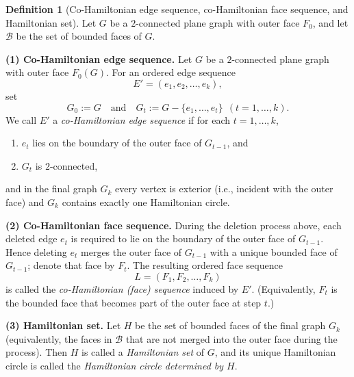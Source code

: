 \documentclass[12pt]{amsart}
\theoremstyle{theorem}%
\theoremstyle{definition}%
\newtheorem{definition}{Definition}
\begin{document}
\begin{definition}[Co-Hamiltonian edge sequence, co-Hamiltonian face sequence, and Hamiltonian set]\label{coh}
Let $G$ be a $2$-connected plane graph with outer face $F_0$, and let $\mathcal{B}$ be the set of bounded faces of $G$.

\smallskip
\noindent\textbf{(1) Co-Hamiltonian edge sequence.}
Let $G$ be a $2$-connected plane graph with outer face $F_0(G)$.
For an ordered edge sequence
\[
E'=(e_1,e_2,\dots,e_k),
\]
set
\[
G_0:=G
\quad\text{and}\quad
G_t:=G-\{e_1,\dots,e_t\}\ \ (t=1,\dots,k).
\]
We call $E'$ a \emph{co-Hamiltonian edge sequence} if for each $t=1,\dots,k$,
\begin{enumerate}
\item $e_t$ lies on the boundary of the outer face of $G_{t-1}$, and
\item $G_t$ is $2$-connected,
\end{enumerate}
and in the final graph $G_k$ every vertex is exterior (i.e., incident with the outer face) and
$G_k$ contains exactly one Hamiltonian circle.


\smallskip
\noindent\textbf{(2) Co-Hamiltonian face sequence.}
During the deletion process above, each deleted edge $e_t$ is required to lie on the boundary of the outer face of $G_{t-1}$.
Hence deleting $e_t$ merges the outer face of $G_{t-1}$ with a unique bounded face of $G_{t-1}$; denote that face by $F_t$.
The resulting ordered face sequence
\[
L=(F_1,F_2,\dots,F_k)
\]
is called the \emph{co-Hamiltonian (face) sequence} induced by $E'$.
(Equivalently, $F_t$ is the bounded face that becomes part of the outer face at step $t$.)

\smallskip
\noindent\textbf{(3) Hamiltonian set.}
Let $H$ be the set of bounded faces of the final graph $G_k$ (equivalently, the faces in $\mathcal{B}$ that are not merged into the outer face during the process).
Then $H$ is called a \emph{Hamiltonian set} of $G$, and its unique Hamiltonian circle is called the \emph{Hamiltonian circle determined by $H$}.
\end{definition}
\end{document}
